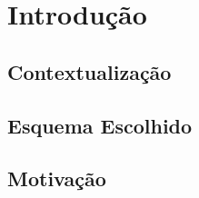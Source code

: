 \chapter{Introdução}
\label{cap:introducao}

\section{Contextualização}
\label{sec:contextualizacao}

\section{Esquema Escolhido}
\label{sec:esquema}

\section{Motivação}
\label{sec:motivacao}
